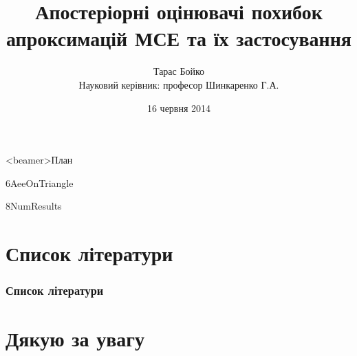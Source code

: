 \documentclass[12pt]{beamer}
\title[Апостеріорні оцінювачі похибок МСЕ]{Апостеріорні оцінювачі похибок апроксимацій МСЕ та їх застосування}
\author[Тарас Бойко]{Тарас Бойко\\[0.4cm] \footnotesize Науковий керівник: професор Шинкаренко Г.А.}
\date{16 червня 2014}
\begin{document}
	

	\begin{frame}<beamer>{План}
		\setcounter{tocdepth}{1}
		\tableofcontents
	\end{frame}

	
	
	
	
	
	{6AeeOnTriangle}
	
	{8NumResults}

	

	\section*{Список літератури}
	\frame{\sectionpage}
	\begin{frame}[allowframebreaks]
		\frametitle<presentation>{Список літератури}
		\nocite{*}
		\printbibliography
	\end{frame}

	\section*{Дякую за увагу}
	\frame{\sectionpage}
\end{document}

